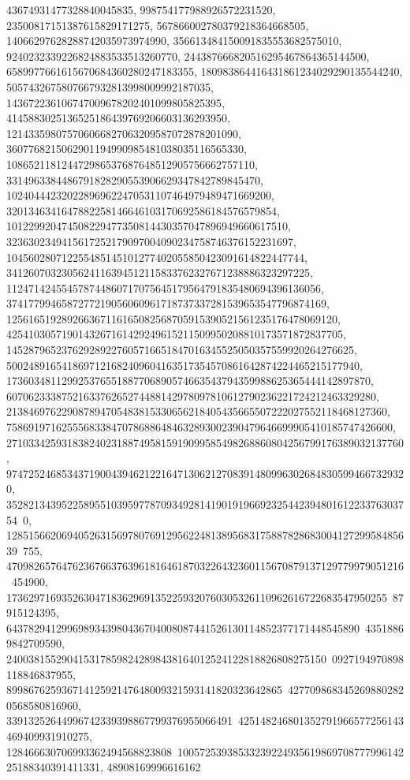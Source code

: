 {{{   43674931477328840045835, 998754177988926572231520, 
   23500817151387615829171275, 567866002780379218364668505, 
   14066297628288742035973974990, 356613484150091835553682575010, 
   9240232339226824883533513260770, 244387666820516295467864365144500, 
   6589977661615670684360280247183355, 180983864416431861234029290135544240, 
   5057432675807667932813998009992187035, 
   143672236106747009678202401099805825395, 
   4145883025136525186439769206603136293950, 
   121433598075706066827063209587072878201090, 
   3607768215062901194990985481038035116565330, 
   108652118124472986537687648512905756662757110, 
   3314963384486791828290553906629347842789845470, 
   102404442320228969622470531107464979489471669200, 
   3201346341647882258146646103170692586184576579854, 
   101229920474508229477350814430357047896949660617510, 
   3236302349415617252179097004090234758746376152231697, 
   104560280712255485145101277402055850423091614822447744, 
   3412607032305624116394512115833762327671238886323297225, 
   112471424554578744860717075645179564791835480694396136056, 
   3741779946587277219056060961718737337281539653547796874169, 
   125616519289266367116165082568705915390521561235176478069120, 
   4254103057190143267161429249615211509950208810173571872837705, 
   145287965237629289227605716651847016345525050357559920264276625, 
   5002489165418697121682409604163517354570861642874224465215177940, 
   173603481129925376551887706890574663543794359988625365444142897870, 
   6070623338752163376265274488142978097810612790236221724212463329280, 
   213846976229087894705483815330656218405435665507222027552118468127360, 
   7586919716255568338470786886484632893002390479646699905410185747426600, 
   271033425931838240231887495815919099585498268860804256799176389032137760, 
   9747252468534371900439462122164713062127083914809963026848305994667329320, 
   35282134395225895510395977870934928141901919669232544239480161223376303754\
0, 
   12851566206940526315697807691295622481389568317588782868300412729958485639\
755, 470982657647623676637639618164618703226432360115670879137129779979051216\
454900, 173629716935263047183629691352259320760305326110962616722683547950255\
87915124395, 6437829412996989343980436704008087441526130114852377171448545890\
43518869842709590, 2400381552904153178598242898438164012524122818826808275150\
0927194970898118846837955, 89986762593671412592147648009321593141820323642865\
4277098683452698802820568580816960, 33913252644996742339398867799376955066491\
425148246801352791966577256143469409931910275, 128466630706993362494568823808\
1005725393853323922493561986970877799614225188340391411331, 48908169996616162\
}}}
